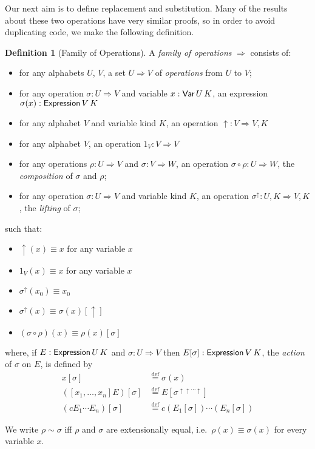 \documentclass{article}
\newcommand{\eqdef}{\ensuremath{\stackrel{\mathrm{def}}{=}}}
\theoremstyle{definition}
\newtheorem{df}[lm]{Definition}
\begin{document}
Our next aim is to define replacement and substitution.  Many of the results about these two operations have very similar proofs, so in order to avoid duplicating
code, we make the following definition.

\begin{df}[Family of Operations]
 A \emph{family of operations} $\Rightarrow$ consists of:
 \begin{itemize}
  \item for any alphabets $U$, $V$, a set $U \Rightarrow V$ of \emph{operations} from $U$ to $V$;
  \item for any operation $\sigma : U \Rightarrow V$ and variable $x : \AgdaDatatype{Var} \, U \, K$, an expression $\sigma(x) : \AgdaFunction{Expression} \,
  V \, K$ %
  \item for any alphabet $V$ and variable kind $K$, an operation $\uparrow : V \Rightarrow V , K$
  \item for any alphabet $V$, an operation $1_V : V \Rightarrow V$
  \item for any operations $\rho : U \Rightarrow V$ and $\sigma : V \Rightarrow W$, an operation $\sigma \circ \rho : U \Rightarrow W$, the
  \emph{composition} of $\sigma$ and $\rho$;
  \item for any operation $\sigma : U \Rightarrow V$ and variable kind $K$, an operation $\sigma^\uparrow : U , K \Rightarrow V , K$, the \emph{lifting} of $\sigma$;
 \end{itemize}
such that:
\begin{itemize}
 \item $\uparrow(x) \equiv x$ for any variable $x$
 \item $1_V(x) \equiv x$ for any variable $x$
 \item $\sigma^\uparrow(x_0) \equiv x_0$ %
 \item $\sigma^\uparrow(x) \equiv \sigma(x) [ \uparrow ]$
 \item $(\sigma \circ \rho)(x) \equiv \rho(x) [ \sigma ]$
\end{itemize}
where, if $E : \AgdaFunction{Expression} \, U \, K$ and $\sigma : U \Rightarrow V$ then $E [ \sigma ] : \AgdaFunction{Expression} \, V \, K$,
the \emph{action} of $\sigma$ on $E$, is defined by
\begin{eqnarray*}
 x [ \sigma ] & \eqdef \sigma(x) \\
 ([x_1, \ldots, x_n] E) [ \sigma ] & \eqdef E [ \sigma^{\uparrow \uparrow \cdots \uparrow} ] \\
 (c E_1 \cdots E_n) [ \sigma ] & \eqdef c (E_1 [ \sigma ]) \cdots (E_n [ \sigma ])
\end{eqnarray*}

We write $\rho \sim \sigma$ iff $\rho$ and $\sigma$ are extensionally equal, i.e.~$\rho(x) \equiv \sigma(x)$ for every variable $x$.
\end{df}
\end{document}
